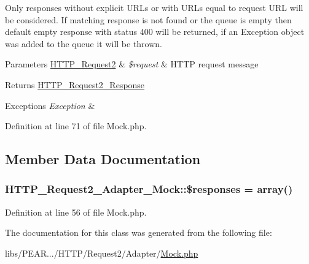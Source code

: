 Only responses without explicit U\+R\+Ls or with U\+R\+Ls equal to request U\+R\+L will be considered. If matching response is not found or the queue is empty then default empty response with status 400 will be returned, if an Exception object was added to the queue it will be thrown.


\begin{DoxyParams}[1]{Parameters}
\hyperlink{classHTTP__Request2}{H\+T\+T\+P\+\_\+\+Request2} & {\em \$request} & H\+T\+T\+P request message\\
\hline
\end{DoxyParams}
\begin{DoxyReturn}{Returns}
\hyperlink{classHTTP__Request2__Response}{H\+T\+T\+P\+\_\+\+Request2\+\_\+\+Response} 
\end{DoxyReturn}

\begin{DoxyExceptions}{Exceptions}
{\em Exception} & \\
\hline
\end{DoxyExceptions}


Definition at line 71 of file Mock.\+php.



\subsection{Member Data Documentation}
\hypertarget{classHTTP__Request2__Adapter__Mock_a2717aa3ac157e464e3c71892bb4dd1a1}{}
\subsubsection[{\$responses}]{\setlength{\rightskip}{0pt plus 5cm}H\+T\+T\+P\+\_\+\+Request2\+\_\+\+Adapter\+\_\+\+Mock\+::\$responses = array()\hspace{0.3cm}{\ttfamily [protected]}}\label{classHTTP__Request2__Adapter__Mock_a2717aa3ac157e464e3c71892bb4dd1a1}


Definition at line 56 of file Mock.\+php.



The documentation for this class was generated from the following file\+:\begin{DoxyCompactItemize}
\item 
libs/\+P\+E\+A\+R.../\+H\+T\+T\+P/\+Request2/\+Adapter/\hyperlink{Mock_8php}{Mock.\+php}\end{DoxyCompactItemize}
